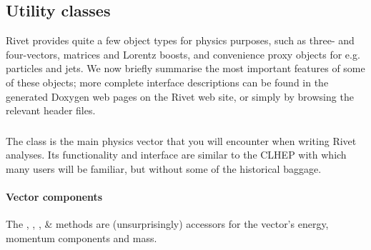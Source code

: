 \documentclass{JHEP3}
\begin{document}



\subsection{Utility classes}

Rivet provides quite a few object types for physics purposes, such as three- and
four-vectors, matrices and Lorentz boosts, and convenience proxy objects for
e.g. particles and jets. We now briefly summarise the most important features of
some of these objects; more complete interface descriptions can be found in the
generated Doxygen web pages on the Rivet web site, or simply by browsing the
relevant header files.

\subsubsection{}

The  class is the main physics vector that you will encounter
when writing Rivet analyses. Its functionality and interface are similar to the
CLHEP  with which many users will be familiar, but
without some of the historical baggage.

\paragraph{Vector components}%
The  , , ,  \&
 methods are (unsurprisingly) accessors for the vector's energy,
momentum components and mass.
\end{document}
